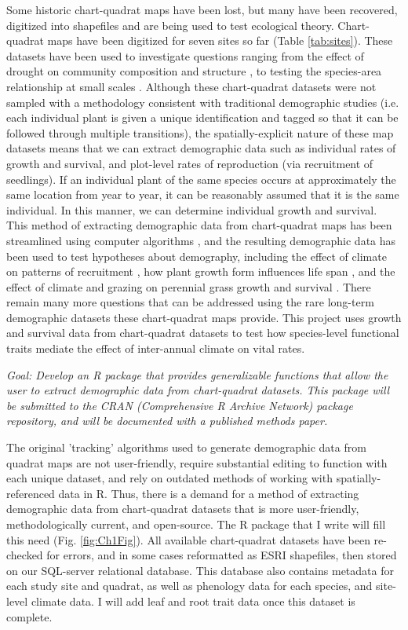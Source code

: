 \documentclass[12pt, letterpaper]{article}
\begin{document}
Some historic chart-quadrat maps have been lost, but many have been recovered, digitized into shapefiles and are being used to test ecological theory. Chart-quadrat maps have been digitized for seven sites so far (Table \ref{tab:sites})\cite{Adler2007, Anderson2011, Zachmann2010, Chu2013, Anderson2012}. These datasets have been used to investigate questions ranging from the effect of drought on community composition and structure \cite{Albertson1965}, to testing the species-area relationship at small scales \cite{Adler2003}. Although these chart-quadrat datasets were not sampled with a methodology consistent with traditional demographic studies (i.e. each individual plant is given a unique identification and tagged so that it can be followed through multiple transitions), the spatially-explicit nature of these map datasets means that we can extract demographic data such as individual rates of growth and survival, and plot-level rates of reproduction (via recruitment of seedlings). If an individual plant of the same species occurs at approximately the same location from year to year, it can be reasonably assumed that it is the same individual. In this manner, we can determine individual growth and survival. This method of extracting demographic data from chart-quadrat maps has been streamlined using computer algorithms \cite{Lauenroth2008}, and the resulting demographic data has been used to test hypotheses about demography, including the effect of climate on patterns of recruitment \cite{Fair1999}, how plant growth form influences life span \cite{Chu2014}, and the effect of climate and grazing on perennial grass growth and survival \cite{Wright1976}. There remain many more questions that can be addressed using the rare long-term demographic datasets these chart-quadrat maps provide. This project uses growth and survival data from chart-quadrat datasets to test how species-level functional traits mediate the effect of inter-annual climate on vital rates.

\textit{Goal: Develop an \textsf{R} package that provides generalizable functions that allow the user to extract demographic data from chart-quadrat datasets. This package will be submitted to the CRAN (Comprehensive \textsf{R} Archive Network) package repository, and will be documented with a published methods paper.}

The original 'tracking' algorithms used to generate demographic data from quadrat maps are not user-friendly, require substantial editing to function with each unique dataset, and rely on outdated methods of working with spatially-referenced data in R. Thus, there is a demand for a method of extracting demographic data from chart-quadrat datasets that is more user-friendly, methodologically current, and open-source. The \textsf{R} package that I write will fill this need (Fig. \ref{fig:Ch1Fig}).
All available chart-quadrat datasets \cite{Adler2007,Chu2013,Anderson2011,Anderson2012,Zachmann2010} have been re-checked for errors, and in some cases reformatted as ESRI shapefiles, then stored on our SQL-server relational database. This database also contains metadata for each study site and quadrat, as well as phenology data for each species, and site-level climate data. I will add leaf and root trait data once this dataset is complete. 
\end{document}
